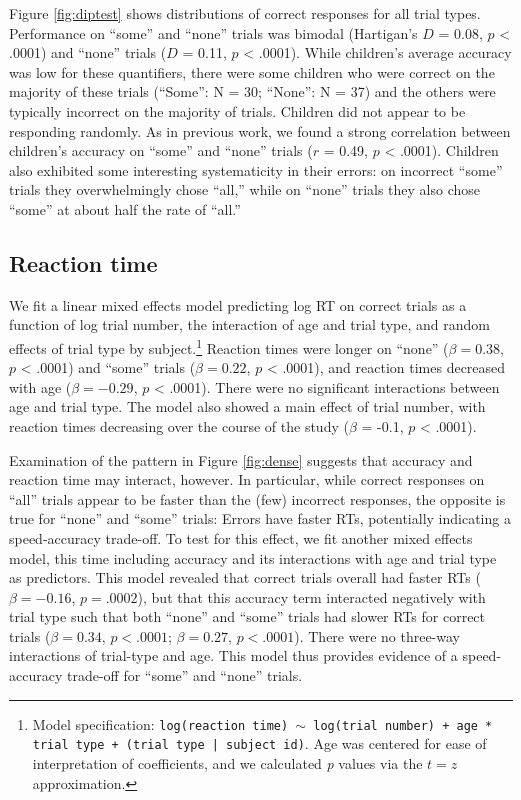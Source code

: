 \documentclass[10pt, letterpaper]{article}
\begin{document}
Figure \ref{fig:diptest} shows distributions of correct responses for
all trial types. Performance on ``some'' and ``none'' trials was bimodal
(Hartigan's \(D\) = 0.08, \(p\) \textless{} .0001) and ``none'' trials
(\(D\) = 0.11, \(p\) \textless{} .0001). While children's average
accuracy was low for these quantifiers, there were some children who
were correct on the majority of these trials (``Some'': N = 30;
``None'': N = 37) and the others were typically incorrect on the
majority of trials. Children did not appear to be responding randomly.
As in previous work, we found a strong correlation between children's
accuracy on ``some'' and ``none'' trials (\(r\) = 0.49, \(p\)
\textless{} .0001). Children also exhibited some interesting
systematicity in their errors: on incorrect ``some'' trials they
overwhelmingly chose ``all,'' while on ``none'' trials they also chose
``some'' at about half the rate of ``all.''

\subsection{Reaction time}\label{reaction-time}

We fit a linear mixed effects model predicting log RT on correct trials
as a function of log trial number, the interaction of age and trial
type, and random effects of trial type by subject.\footnote{Model
  specification:
  \texttt{log(reaction time) $\sim$ log(trial number) + age * trial type + (trial type | subject id)}.
  Age was centered for ease of interpretation of coefficients, and we
  calculated \emph{p} values via the \(t=z\) approximation.} Reaction
times were longer on ``none'' (\(\beta = 0.38\), \(p\) \textless{}
.0001) and ``some'' trials (\(\beta = 0.22\), \(p\) \textless{} .0001),
and reaction times decreased with age (\(\beta = -0.29\), \(p\)
\textless{} .0001). There were no significant interactions between age
and trial type. The model also showed a main effect of trial number,
with reaction times decreasing over the course of the study (\(\beta\) =
-0.1, \(p\) \textless{} .0001).

Examination of the pattern in Figure \ref{fig:dense} suggests that
accuracy and reaction time may interact, however. In particular, while
correct responses on ``all'' trials appear to be faster than the (few)
incorrect responses, the opposite is true for ``none'' and ``some''
trials: Errors have faster RTs, potentially indicating a speed-accuracy
trade-off. To test for this effect, we fit another mixed effects model,
this time including accuracy and its interactions with age and trial
type as predictors. This model revealed that correct trials overall had
faster RTs (\(\beta = -0.16\), \(p = .0002\)), but that this accuracy
term interacted negatively with trial type such that both ``none'' and
``some'' trials had slower RTs for correct trials (\(\beta = 0.34\),
\(p < .0001\); \(\beta = 0.27\), \(p < .0001\)). There were no three-way
interactions of trial-type and age. This model thus provides evidence of
a speed-accuracy trade-off for ``some'' and ``none'' trials.
\end{document}

